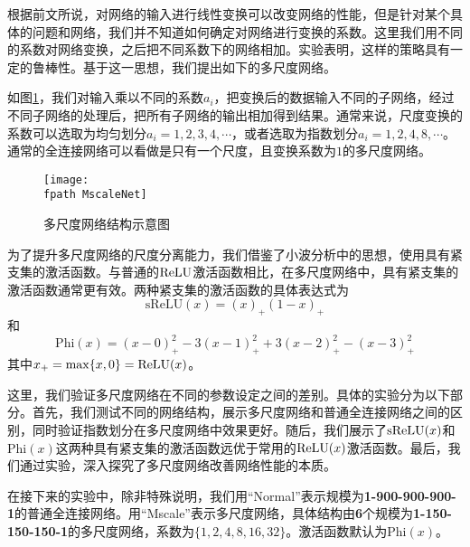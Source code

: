 


根据前文所说，对网络的输入进行线性变换可以改变网络的性能，但是针对某个具体的问题和网络，我们并不知道如何确定对网络进行变换的系数。这里我们用不同的系数对网络变换，之后把不同系数下的网络相加。实验表明，这样的策略具有一定的鲁棒性。基于这一思想，我们提出如下的多尺度网络。

如图\ref{net}，我们对输入乘以不同的系数$a_i$，把变换后的数据输入不同的子网络，经过不同子网络的处理后，把所有子网络的输出相加得到结果。通常来说，尺度变换的系数可以选取为均匀划分$a_i = 1,2,3,4,\cdots$，或者选取为指数划分$a_i = 1,2,4,8,\cdots$。通常的全连接网络可以看做是只有一个尺度，且变换系数为$1$的多尺度网络。

\begin{figure}[htbp]
\centering\texttt{[image: \\fpath MscaleNet]}
\caption{多尺度网络结构示意图}
\label{net}
\end{figure}

为了提升多尺度网络的尺度分离能力，我们借鉴了小波分析中的思想，使用具有紧支集的激活函数。与普通的${\rm ReLU}$激活函数相比，在多尺度网络中，具有紧支集的激活函数通常更有效。两种紧支集的激活函数的具体表达式为
\begin{equation}
\mathrm{sReLU}(x) = (x)_{+} (1-x)_{+}
\end{equation}
和
\begin{equation}
\mathrm{Phi}(x) = (x-0)_{+}^2 - 3(x-1)_{+}^2 + 3(x-2)_{+}^2 - (x-3)_{+}^2
\end{equation}
其中$x_{+} = \max\{x, 0\}={\rm ReLU}(x)$。


这里，我们验证多尺度网络在不同的参数设定之间的差别。具体的实验分为以下部分。首先，我们测试不同的网络结构，展示多尺度网络和普通全连接网络之间的区别，同时验证指数划分在多尺度网络中效果更好。随后，我们展示了${\rm sReLU}(x)$和$\mathrm{Phi}(x)$这两种具有紧支集的激活函数远优于常用的${\rm ReLU}(x)$激活函数。最后，我们通过实验，深入探究了多尺度网络改善网络性能的本质。

在接下来的实验中，除非特殊说明，我们用“Normal”表示规模为\textbf{1-900-900-900-1}的普通全连接网络。用“Mscale”表示多尺度网络，具体结构由\textbf{6}个规模为\textbf{1-150-150-150-1}的多尺度网络，系数为$\{1,2,4,8,16,32\}$。激活函数默认为$\mathrm{Phi}(x)$。


